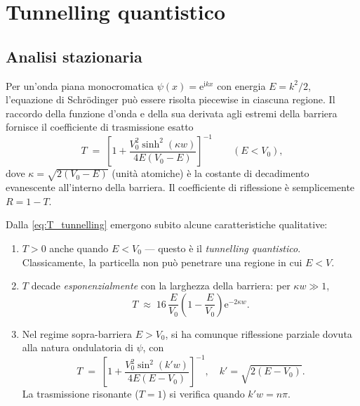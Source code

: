 \documentclass[12pt, a4paper]{article}
\newcommand{\ii}{\mathrm{i}}          %
\newcommand{\ee}{\mathrm{e}}          %
\begin{document}
\section{Tunnelling quantistico}
\label{sec:tunnelling}

\subsection{Analisi stazionaria}

Per un'onda piana monocromatica $\psi(x) = \ee^{\ii kx}$ con energia
$E = k^2/2$, l'equazione di Schr\"{o}dinger può essere risolta
piecewise in ciascuna regione.  Il raccordo della funzione d'onda e
della sua derivata agli estremi della barriera fornisce il coefficiente
di trasmissione esatto \cite{Griffiths2018}
\begin{equation}
  T \;=\; \left[1 + \frac{V_0^2\sinh^2(\kappa w)}{4E(V_0-E)}\right]^{-1}
  \qquad (E < V_0),
  \label{eq:T_tunnelling}
\end{equation}
dove $\kappa = \sqrt{2(V_0-E)}$ (unità atomiche) è la costante di
decadimento evanescente all'interno della barriera.  Il coefficiente
di riflessione è semplicemente $R = 1 - T$.

Dalla \eqref{eq:T_tunnelling} emergono subito alcune caratteristiche
qualitative:
\begin{enumerate}
  \item $T > 0$ anche quando $E < V_0$ --- questo è il \emph{tunnelling
        quantistico}.  Classicamente, la particella non può penetrare
        una regione in cui $E < V$.
  \item $T$ decade \emph{esponenzialmente} con la larghezza della
        barriera: per $\kappa w \gg 1$,
        \begin{equation}
          T \;\approx\; 16\,\frac{E}{V_0}\!\left(1 - \frac{E}{V_0}\right)
          \ee^{-2\kappa w}.
        \end{equation}
  \item Nel regime sopra-barriera $E > V_0$, si ha comunque riflessione
        parziale dovuta alla natura ondulatoria di $\psi$, con
        \begin{equation}
          T \;=\; \left[1 + \frac{V_0^2\sin^2(k' w)}{4E(E-V_0)}\right]^{-1},
          \quad k' = \sqrt{2(E-V_0)}.
        \end{equation}
        La trasmissione risonante ($T = 1$) si verifica quando
        $k'w = n\pi$.
\end{enumerate}
\end{document}
